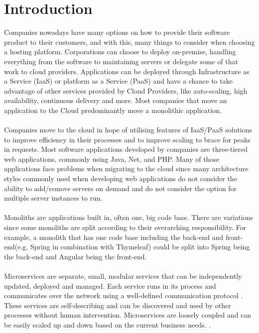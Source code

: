 \documentclass[BIF,Bachelor,nenglish]{twbook}%
\begin{document}
\maketitle

%
%
\chapter{Introduction}
Companies nowadays have many options on how to provide their software product to their customers, and with this, many things to consider when choosing a hosting platform. Corporations can choose to deploy on-premise, handling everything from the software to maintaining servers or delegate some of that work to cloud providers. Applications can be deployed through Infrastructure as a Service (IaaS)\cite{microIaas} or platform as a Service (PaaS)\cite{redPaas} and have a chance to take advantage of other services provided by Cloud Providers, like auto-scaling, high availability, continuous delivery and more. Most companies that move an application to the Cloud predominantly move a monolithic application.
\\
\\
Companies move to the cloud in hope of utilising features of IaaS/PaaS solutions to improve efficiency in their processes and to improve scaling to brace for peaks in requests. Most software applications developed by companies are three-tiered web applications, commonly using Java, Net, and PHP. Many of those applications face problems when migrating to the cloud since many architecture styles commonly used when developing web applications do not consider the ability to add/remove servers on demand and do not consider the option for multiple server instances to run.
\\
\\
Monoliths are applications built in, often one, big code base. There are variations since some monoliths are split according to their overarching responsibility. For example, a monolith that has one code base including the back-end and front-end(e.g. Spring in combination with Thymeleaf) could be split into Spring being the back-end and Angular being the front-end.
\\
\\
Microservices are separate, small, modular services that can be independently updated, deployed and managed. Each service runs in its process and communicates over the network using a well-defined communication protocol \cite{fow2014}. These services are self-describing and can be discovered and used by other processes without human intervention. Microservices are loosely coupled and can be easily scaled up and down based on the current business needs. \cite{ade2017}.
\end{document}
